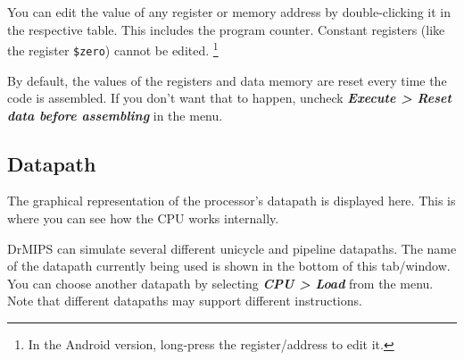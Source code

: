 \documentclass[11pt,a4paper,twoside,titlepage]{article}
\newcommand{\menupath}[1]{\textbf{\emph{#1}}}
\begin{document}
You can edit the value of any register or memory address by double-clicking
it in the respective table. This includes the program counter.
Constant registers (like the register \verb+$zero+) cannot be edited.
\footnote{In the Android version, long-press the register/address to edit it.}

By default, the values of the registers and data memory are reset every time
the code is assembled.
If you don't want that to happen, uncheck 
\menupath{Execute > Reset data before assembling} in the menu.


\subsection{Datapath}

The graphical representation of the processor's datapath is displayed here.
This is where you can see how the CPU works internally.

DrMIPS can simulate several different unicycle and pipeline datapaths.
The name of the datapath currently being used is shown in the bottom of this
tab/window. You can choose another datapath by selecting 
\menupath{CPU > Load} from the menu.
Note that different datapaths may support different instructions.
\end{document}
